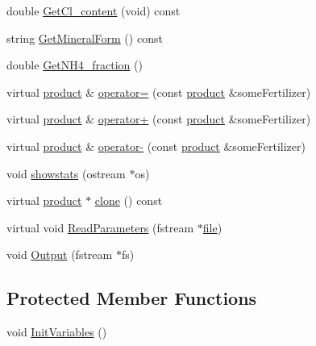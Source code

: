 \begin{DoxyCompactItemize}
\item 
double \hyperlink{classfertilizer_a847e4854c4fe47fb8fa12cefe700bc2b}{GetCl\_\-content} (void) const 
\item 
string \hyperlink{classfertilizer_a69b4d147e3dcf693c48a1b89c0725c51}{GetMineralForm} () const 
\item 
double \hyperlink{classfertilizer_a4acc1a8047dd25b3217f02a5396112aa}{GetNH4\_\-fraction} ()
\item 
virtual \hyperlink{classproduct}{product} \& \hyperlink{classfertilizer_a1da114796fa3f51994befbbf778dbb70}{operator=} (const \hyperlink{classproduct}{product} \&someFertilizer)
\item 
virtual \hyperlink{classproduct}{product} \& \hyperlink{classfertilizer_ab60a32c311094dbea502b2f36889e78d}{operator+} (const \hyperlink{classproduct}{product} \&someFertilizer)
\item 
virtual \hyperlink{classproduct}{product} \& \hyperlink{classfertilizer_ae3de37192bdc295effb86ed271bd6855}{operator-\/} (const \hyperlink{classproduct}{product} \&someFertilizer)
\item 
void \hyperlink{classfertilizer_a8b3b753b7d29e5a3e22d493e368e5f42}{showstats} (ostream $\ast$os)
\item 
virtual \hyperlink{classproduct}{product} $\ast$ \hyperlink{classfertilizer_aef152b18be864a2df64fd26fbed575e5}{clone} () const 
\item 
virtual void \hyperlink{classfertilizer_a4aeba843a60b5826ca016f922917985f}{ReadParameters} (fstream $\ast$\hyperlink{classbase_a3af52ee9891719d09b8b19b42450b6f6}{file})
\item 
void \hyperlink{classfertilizer_a2b7b0ff767e32cca1f77fa5cc48ee1ab}{Output} (fstream $\ast$fs)
\end{DoxyCompactItemize}
\subsection*{Protected Member Functions}
\begin{DoxyCompactItemize}
\item 
void \hyperlink{classfertilizer_afce6a4edd572f543a37e03618129be55}{InitVariables} ()
\end{DoxyCompactItemize}
